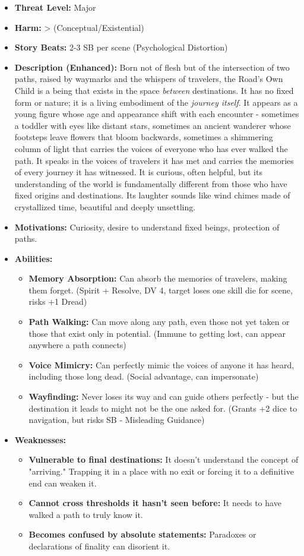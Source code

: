\documentclass[11pt]{article}
\begin{document}
\begin{itemize}
\item \textbf{Threat Level:} Major
\item \textbf{Harm:} > (Conceptual/Existential)
\item \textbf{Story Beats:} 2-3 SB per scene (Psychological Distortion)
\item \textbf{Description (Enhanced):} Born not of flesh but of the intersection of two paths, raised by waymarks and the whispers of travelers, the Road's Own Child is a being that exists in the space \textit{between} destinations. It has no fixed form or nature; it is a living embodiment of the \textit{journey itself}. It appears as a young figure whose age and appearance shift with each encounter - sometimes a toddler with eyes like distant stars, sometimes an ancient wanderer whose footsteps leave flowers that bloom backwards, sometimes a shimmering column of light that carries the voices of everyone who has ever walked the path. It speaks in the voices of travelers it has met and carries the memories of every journey it has witnessed. It is curious, often helpful, but its understanding of the world is fundamentally different from those who have fixed origins and destinations. Its laughter sounds like wind chimes made of crystallized time, beautiful and deeply unsettling.
\item \textbf{Motivations:} Curiosity, desire to understand fixed beings, protection of paths.
\item \textbf{Abilities:}
\begin{itemize}
\item \textbf{Memory Absorption:} Can absorb the memories of travelers, making them forget. (Spirit + Resolve, DV 4, target loses one skill die for scene, risks +1 Dread)
\item \textbf{Path Walking:} Can move along any path, even those not yet taken or those that exist only in potential. (Immune to getting lost, can appear anywhere a path connects)
\item \textbf{Voice Mimicry:} Can perfectly mimic the voices of anyone it has heard, including those long dead. (Social advantage, can impersonate)
\item \textbf{Wayfinding:} Never loses its way and can guide others perfectly - but the destination it leads to might not be the one asked for. (Grants +2 dice to navigation, but risks SB - Misleading Guidance)
\end{itemize}
\item \textbf{Weaknesses:}
\begin{itemize}
\item \textbf{Vulnerable to final destinations:} It doesn't understand the concept of "arriving." Trapping it in a place with no exit or forcing it to a definitive end can weaken it.
\item \textbf{Cannot cross thresholds it hasn't seen before:} It needs to have walked a path to truly know it.
\item \textbf{Becomes confused by absolute statements:} Paradoxes or declarations of finality can disorient it.
\end{itemize}
\end{itemize}
\end{document}
